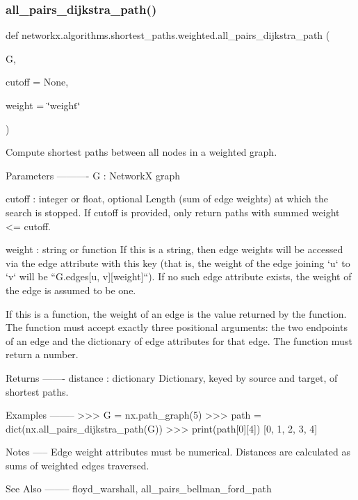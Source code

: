 \subsubsection{\texorpdfstring{all\+\_\+pairs\+\_\+dijkstra\+\_\+path()}{all\_pairs\_dijkstra\_path()}}
{\footnotesize\ttfamily def networkx.\+algorithms.\+shortest\+\_\+paths.\+weighted.\+all\+\_\+pairs\+\_\+dijkstra\+\_\+path (\begin{DoxyParamCaption}\item[{}]{G,  }\item[{}]{cutoff = {\ttfamily None},  }\item[{}]{weight = {\ttfamily \char`\"{}weight\char`\"{}} }\end{DoxyParamCaption})}

\begin{DoxyVerb}Compute shortest paths between all nodes in a weighted graph.

Parameters
----------
G : NetworkX graph

cutoff : integer or float, optional
    Length (sum of edge weights) at which the search is stopped.
    If cutoff is provided, only return paths with summed weight <= cutoff.

weight : string or function
    If this is a string, then edge weights will be accessed via the
    edge attribute with this key (that is, the weight of the edge
    joining `u` to `v` will be ``G.edges[u, v][weight]``). If no
    such edge attribute exists, the weight of the edge is assumed to
    be one.

    If this is a function, the weight of an edge is the value
    returned by the function. The function must accept exactly three
    positional arguments: the two endpoints of an edge and the
    dictionary of edge attributes for that edge. The function must
    return a number.

Returns
-------
distance : dictionary
    Dictionary, keyed by source and target, of shortest paths.

Examples
--------
>>> G = nx.path_graph(5)
>>> path = dict(nx.all_pairs_dijkstra_path(G))
>>> print(path[0][4])
[0, 1, 2, 3, 4]

Notes
-----
Edge weight attributes must be numerical.
Distances are calculated as sums of weighted edges traversed.

See Also
--------
floyd_warshall, all_pairs_bellman_ford_path\end{DoxyVerb}
 \mbox{\label{namespacenetworkx_1_1algorithms_1_1shortest__paths_1_1weighted_acca70fc51bf6bb5ad9d9e41e4451e5e6}} 
